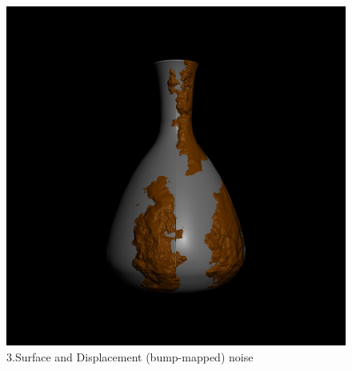 \documentclass[12pt,letterpaper]{article}
\begin{document}
\begin{figure}[p]
    \centering
    \includegraphics[width=1.\textwidth]{lab2_bump.jpg}
    \caption{3.Surface and Displacement (bump-mapped) noise}
\end{figure}
\end{document}
